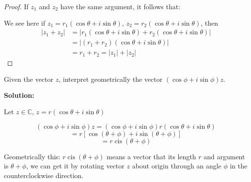 \begin{proof}
    If \( z_1 \) and \( z_2 \) have the same argument, it follows that:

    We see here if $z_1 = r_1(\cos \theta + i \sin \theta)$, $z_2 = r_2(\cos \theta + i \sin \theta)$, then
\begin{align*}
|z_1 + z_2| &= |r_1(\cos \theta + i \sin \theta) + r_2(\cos \theta + i \sin \theta)| \\
&= |(r_1 + r_2)(\cos \theta + i \sin \theta)| \\
&= r_1 + r_2 = |z_1| + |z_2|
\end{align*}
\end{proof}
\begin{exercise}
    Given the vector \( z \), interpret geometrically the vector \( (\cos \phi + i \sin \phi)z \).
\end{exercise}
\textbf{Solution:}

Let \( z \in \mathbb{C} \), \( z = r(\cos \theta + i \sin \theta) \)

\[
(\cos \phi + i \sin \phi)z = (\cos \phi + i \sin \phi)r(\cos \theta + i \sin \theta)
\]
\[
= r[\cos(\theta + \phi) + i \sin(\theta + \phi)]
\]
\[
= r\operatorname{cis}(\theta + \phi)
\]

Geometrically this: \( r\operatorname{cis}(\theta + \phi) \) means a vector that its length \( r \) and argument is \( \theta + \phi \), we can get it by rotating vector \( z \) about origin through an angle \( \phi \) in the counterclockwise direction.

